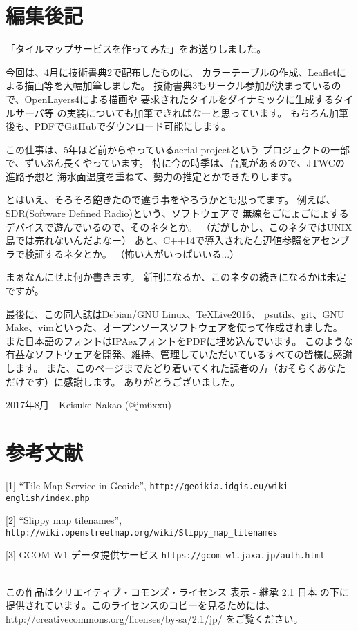 \section*{編集後記}

「タイルマップサービスを作ってみた」をお送りしました。

今回は、4月に技術書典2で配布したものに、
カラーテーブルの作成、Leafletによる描画等を大幅加筆しました。
技術書典3もサークル参加が決まっているので、OpenLayers4による描画や
要求されたタイルをダイナミックに生成するタイルサーバ等
の実装についても加筆できればなーと思っています。
もちろん加筆後も、PDFでGitHubでダウンロード可能にします。

この仕事は、5年ほど前からやっているaerial-projectという
プロジェクトの一部で、ずいぶん長くやっています。
特に今の時季は、台風があるので、JTWCの進路予想と
海水面温度を重ねて、勢力の推定とかできたりします。

とはいえ、そろそろ飽きたので違う事をやろうかとも思ってます。
例えば、SDR(Software Defined Radio)という、ソフトウェアで
無線をごにょごにょするデバイスで遊んでいるので、そのネタとか。
（だがしかし、このネタではUNIX島では売れないんだよなー）
あと、C++14で導入された右辺値参照をアセンブラで検証するネタとか。
（怖い人がいっぱいいる...）

まぁなんにせよ何か書きます。
新刊になるか、このネタの続きになるかは未定ですが。


最後に、この同人誌はDebian/GNU Linux、\TeX Live2016、
psutils、git、GNU Make、vimといった、オープンソースソフトウェアを使って作成されました。
また日本語のフォントはIPAexフォントをPDFに埋め込んでいます。
このような有益なソフトウェアを開発、維持、管理していただいているすべての皆様に感謝します。
また、このページまでたどり着いてくれた読者の方（おそらくあなただけです）に感謝します。
ありがとうございました。

\begin{flushright}
2017年8月　Keisuke Nakao (@jm6xxu) 
\end{flushright}

\section*{参考文献}
         [1] ``Tile Map Service in Geoide'', \texttt{http://geoikia.idgis.eu/wiki-english/index.php}
       
       [2] ``Slippy map tilenames'', \texttt{http://wiki.openstreetmap.org/wiki/Slippy\_map\_tilenames}
       
[3] GCOM-W1 データ提供サービス \texttt{https://gcom-w1.jaxa.jp/auth.html}



\clearpage
\mbox{}
\vspace{55em}\\
この作品はクリエイティブ・コモンズ・ライセンス 表示 - 継承 2.1 日本 の下に提供されています。このライセンスのコピーを見るためには、http://creativecommons.org/licenses/by-sa/2.1/jp/ をご覧ください。
